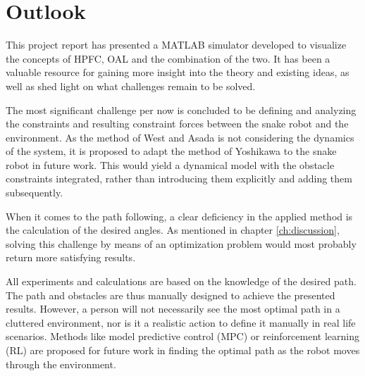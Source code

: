 \chapter{Outlook}\label{outlook}


This project report has presented a MATLAB simulator developed to visualize the concepts of HPFC, OAL and the combination of the two. It has been a valuable resource for gaining more insight into the theory and existing ideas, as well as shed light on what challenges remain to be solved.

The most significant challenge per now is concluded to be defining and analyzing the constraints and resulting constraint forces between the snake robot and the environment. As the method of West and Asada \cite{west1985method} is not considering the dynamics of the system, it is proposed to adapt the method of Yoshikawa \cite{yoshikawa1987dynamic} to the snake robot in future work. This would yield a dynamical model with the obstacle constraints integrated, rather than introducing them explicitly and adding them subsequently.

When it comes to the path following, a clear deficiency in the applied method is the calculation of the desired angles. As mentioned in chapter \ref{ch:discussion}, solving this challenge by means of an optimization problem would most probably return more satisfying results.

All experiments and calculations are based on the knowledge of the desired path. The path and obstacles are thus manually designed to achieve the presented results. However, a person will not necessarily see the most optimal path in a cluttered environment, nor is it a realistic action to define it manually in real life scenarios. Methods like model predictive control (MPC) or reinforcement learning (RL) are proposed for future work in finding the optimal path as the robot moves through the environment.
